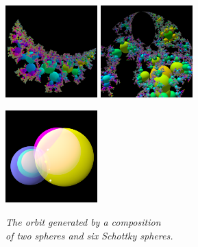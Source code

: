 \begin{figure}[h!tbp]
 \begin{minipage}[t]{0.5\hsize}
  \begin{minipage}[t]{0.25\hsize}
   \center
   \includegraphics[width=1.4in, height=1.4in, keepaspectratio]{./img/application/3dGen/loxoOrbSch.pdf}
  \end{minipage}
  \hspace*{\fill}
  \begin{minipage}[t]{0.25\hsize}
   \center
   \includegraphics[width=1.4in, height=1.4in, keepaspectratio]{./img/application/3dGen/parabolicOrb.pdf}
  \end{minipage}
  \hspace*{\fill}
  \caption{\textit{The orbit generated by a composition \\of two spheres and six Schottky
  spheres.}}
  \label{fig:complicated3d}
 \end{minipage}
 \hspace*{\fill}
 \begin{minipage}[t]{0.5\hsize}
  \begin{minipage}[t]{0.25\hsize}
   \center
   \includegraphics[width=1.4in, height=1.4in, keepaspectratio]{./img/application/3dGen/compLoxoOneGen.pdf}
   \label{fig:compLoxoGen}
  \end{minipage}

\end{minipage}
\end{figure}
